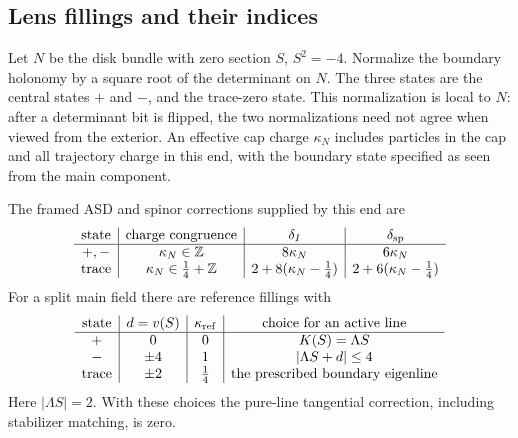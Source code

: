 \subsection{Lens fillings and their indices}

Let $N$ be the disk bundle with zero section $S$, $S^2=-4$.  Normalize the
boundary holonomy by a square root of the determinant on $N$.  The three
states are the central states $+$ and $-$, and the trace-zero state.
This normalization is local to $N$: after a determinant bit is flipped,
the two normalizations need not agree when viewed from the exterior.
An effective cap charge $\kappa_N$ includes particles in the cap and all
trajectory charge in this end, with the boundary state specified as seen
from the main component.

\begin{proposition}\label{prop:indices:lens-index}
The framed ASD and spinor corrections supplied by this end are
\begin{equation}\label{eq:indices:lens-table}
\begin{array}{c|c|c|c}
\text{state}&\text{charge congruence}&\delta_I&\delta_{\rm sp}\\ \hline
 +,-&\kappa_N\in\mathbb Z&8\kappa_N&6\kappa_N\\
 \text{trace}&\kappa_N\in\frac14+\mathbb Z
 &2+8(\kappa_N-\frac14)&2+6(\kappa_N-\frac14)
\end{array}
\end{equation}
For a split main field there are reference fillings with
\begin{equation}\label{eq:indices:reference-fillings}
\begin{array}{c|c|c|c}
\text{state}&d=v(S)&\kappa_{\rm ref}&\text{choice for an active line}\\ \hline
 +&0&0&K(S)=\Lambda S\\
 -&\pm4&1&|\Lambda S+d|\le4\\
 \text{trace}&\pm2&\frac14&\text{the prescribed boundary eigenline}
\end{array}
\end{equation}
Here $|\Lambda S|=2$.  With these choices the pure-line tangential correction,
including stabilizer matching, is zero.
\end{proposition}
